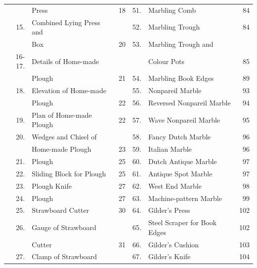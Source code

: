 \documentclass[twoside]{book}
\begin{document}
\begin{tiny}
\begin{tabular}{r l r r l r }
       & Press                     \dotfill & 18     &    51. & Marbling Comb               \dotfill &  84 \\ 
15.    & Combined Lying Press and           &        &    52. & Marbling Trough             \dotfill &  84 \\ 
       & Box                       \dotfill & 20     &    53. & Marbling Trough and                  &     \\ 
16-17. & Details of Home-made               &        &        & Colour Pots                 \dotfill &  85 \\ 
       & Plough                    \dotfill & 21     &    54. & Marbling Book Edges         \dotfill &  89 \\ 
18.    & Elevation of Home-made             &        &    55. & Nonpareil Marble            \dotfill &  93 \\ 
       & Plough                    \dotfill & 22     &    56. & Reversed Nonpareil Marble   \dotfill &  94 \\ 
19.    & Plan of Home-made Plough  \dotfill & 22     &    57. & Wave Nonpareil Marble       \dotfill &  95 \\ 
20.    & Wedges and Chisel of               &        &    58. & Fancy Dutch Marble          \dotfill &  96 \\ 
       & Home-made Plough          \dotfill & 23     &    59. & Italian Marble              \dotfill &  96 \\ 
21.    & Plough                    \dotfill & 25     &    60. & Dutch Antique Marble        \dotfill &  97 \\ 
22.    & Sliding Block for Plough  \dotfill & 25     &    61. & Antique Spot Marble         \dotfill &  97 \\ 
23.    & Plough Knife              \dotfill & 27     &    62. & West End Marble             \dotfill &  98 \\ 
24.    & Plough                    \dotfill & 27     &    63. & Machine-pattern Marble      \dotfill &  99 \\ 
25.    & Strawboard Cutter         \dotfill & 30     &    64. & Gilder's Press              \dotfill & 102 \\ 
26.    & Gauge of Strawboard                &        &    65. & Steel Scraper for Book Edges\dotfill & 102 \\ 
       & Cutter                    \dotfill & 31     &    66. & Gilder's Cushion            \dotfill & 103 \\ 
27.    & Clamp of Strawboard                &        &    67. & Gilder's Knife              \dotfill & 104 \\ 

\end{tabular}
\end{tiny}
\end{document}
